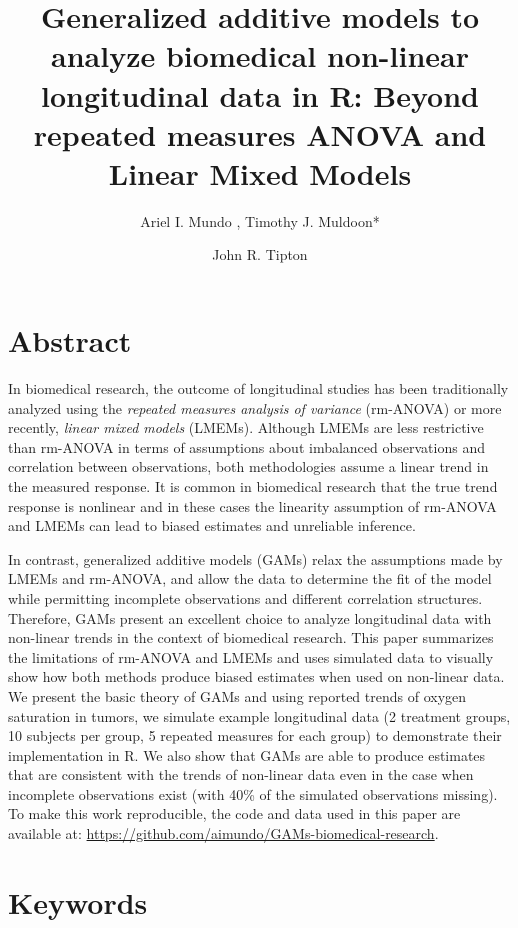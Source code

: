 \documentclass[
]{article}
\author{Ariel I. Mundo \orcidaffila{}, Timothy J. Muldoon*}
\affil{Department of Biomedical Engineering, University of Arkansas, Fayetteville, AR, USA}
\affil{\normalfont {tmuldoon@uark.edu}}
\author{John R. Tipton \orcidaffilb{}}
\affil{Department of Mathematical Sciences, University of Arkansas, Fayetteville, AR, USA}
\title{\textbf{Generalized additive models to analyze biomedical non-linear longitudinal data in R: Beyond repeated measures ANOVA and Linear Mixed Models}}
\date{\vspace{-2.5em}}
\begin{document}
\maketitle

\hypertarget{abstract}{%
\section{Abstract}\label{abstract}}

In biomedical research, the outcome of longitudinal studies has been traditionally analyzed using the \emph{repeated measures analysis of variance} (rm-ANOVA) or more recently, \emph{linear mixed models} (LMEMs). Although LMEMs are less restrictive than rm-ANOVA in terms of assumptions about imbalanced observations and correlation between observations, both methodologies assume a linear trend in the measured response. It is common in biomedical research that the true trend response is nonlinear and in these cases the linearity assumption of rm-ANOVA and LMEMs can lead to biased estimates and unreliable inference.

In contrast, generalized additive models (GAMs) relax the assumptions made by LMEMs and rm-ANOVA, and allow the data to determine the fit of the model while permitting incomplete observations and different correlation structures. Therefore, GAMs present an excellent choice to analyze longitudinal data with non-linear trends in the context of biomedical research. This paper summarizes the limitations of rm-ANOVA and LMEMs and uses simulated data to visually show how both methods produce biased estimates when used on non-linear data. We present the basic theory of GAMs and using reported trends of oxygen saturation in tumors, we simulate example longitudinal data (2 treatment groups, 10 subjects per group, 5 repeated measures for each group) to demonstrate their implementation in R. We also show that GAMs are able to produce estimates that are consistent with the trends of non-linear data even in the case when incomplete observations exist (with 40\% of the simulated observations missing). To make this work reproducible, the code and data used in this paper are available at: \url{https://github.com/aimundo/GAMs-biomedical-research}.

\hypertarget{keywords}{%
\section*{Keywords}\label{keywords}}
\end{document}
